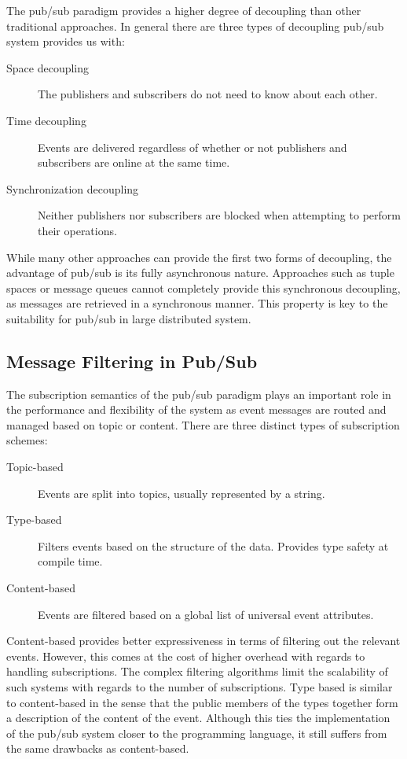 The pub/sub paradigm provides a higher degree of decoupling than other
traditional approaches. In general there are three types of decoupling
pub/sub system provides us with:

\begin{description}
  \item[Space decoupling] The publishers and subscribers do not need to
    know about each other.
  \item[Time decoupling] Events are delivered regardless of whether or
    not publishers and subscribers are online at the same time.
  \item[Synchronization decoupling] Neither publishers nor subscribers
    are blocked when attempting to perform their operations.
\end{description}

While many other approaches can provide the first two forms of
decoupling, the advantage of pub/sub is its fully asynchronous nature.
Approaches such as tuple spaces or message queues cannot completely
provide this synchronous decoupling, as messages are retrieved in a
synchronous manner. This property is key to the suitability for pub/sub
in large distributed system.~\cite{Eugster:2003}

\subsection{Message Filtering in Pub/Sub}

The subscription semantics of the pub/sub paradigm plays an important
role in the performance and flexibility of the system as event messages
are routed and managed based on topic or content. There are three
distinct types of subscription schemes:

\begin{description}
  \item[Topic-based] Events are split into topics, usually represented by
      a string.
  \item[Type-based] Filters events based on the structure of the data.
      Provides type safety at compile time.
  \item[Content-based] Events are filtered based on a global
      list of universal event attributes.
\end{description}

Content-based provides better expressiveness in terms of filtering out
the relevant events. However, this comes at the cost of higher overhead
with regards to handling subscriptions. The complex filtering algorithms
limit the scalability of such systems with regards to the number of
subscriptions. Type based is similar to content-based in the sense that
the public members of the types together form a description of the
content of the event. Although this ties the implementation of the
pub/sub system closer to the programming language, it still suffers from
the same drawbacks as content-based.

